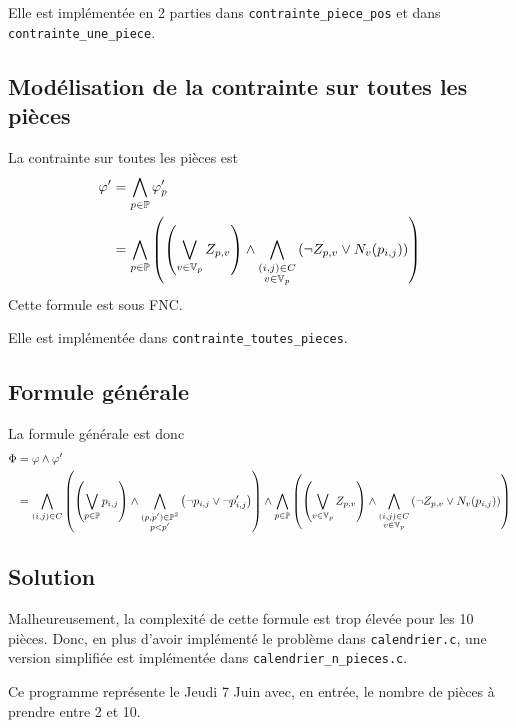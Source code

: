 Elle est implémentée en 2 parties dans \verb|contrainte_piece_pos|
et dans \verb|contrainte_une_piece|.

\subsection{Modélisation de la contrainte sur toutes les pièces}
La contrainte sur toutes les pièces est
\begin{align*}
    \varphi' &= \bigwedge_{p\in\mathbb{P}}  \varphi'_p \\
             &= \bigwedge_{p\in\mathbb{P}} \left(\left( \bigvee_{v\in\mathbb{V}_p} Z_{p,v} \right) \land
                \bigwedge_{\substack{(i,j)\in C\\v\in\mathbb{V}_p}} \left(\lnot Z_{p,v} \lor N_v(p_{i,j}) \right)\right)
\end{align*}
Cette formule est sous FNC.

Elle est implémentée dans \verb|contrainte_toutes_pieces|.

\subsection{Formule générale}
La formule générale est donc
\begin{align*}
\Phi &= \varphi \land \varphi' \\
     &= \bigwedge_{(i,j)\in C} \left(\left(\bigvee_{p\in\mathbb{P}} p_{i,j} \right) \land
        \bigwedge_{\substack{(p,p')\in\mathbb{P}^2\\p<p'}}\left(\lnot p_{i,j} \lor \lnot p'_{i,j}\right)\right) \land
        \bigwedge_{p\in\mathbb{P}} \left(\left( \bigvee_{v\in\mathbb{V}_p} Z_{p,v} \right) \land
        \bigwedge_{\substack{(i,j)\in C\\v\in\mathbb{V}_p}} \left(\lnot Z_{p,v} \lor N_v(p_{i,j}) \right)\right)
\end{align*}

\subsection{Solution}
Malheureusement, la complexité de cette formule est trop élevée pour les 10
pièces. Donc, en plus d'avoir implémenté le problème dans \verb|calendrier.c|,
une version simplifiée est implémentée dans \verb|calendrier_n_pieces.c|.

Ce programme représente le Jeudi 7 Juin avec, en entrée,
le nombre de pièces à prendre entre 2 et 10.

